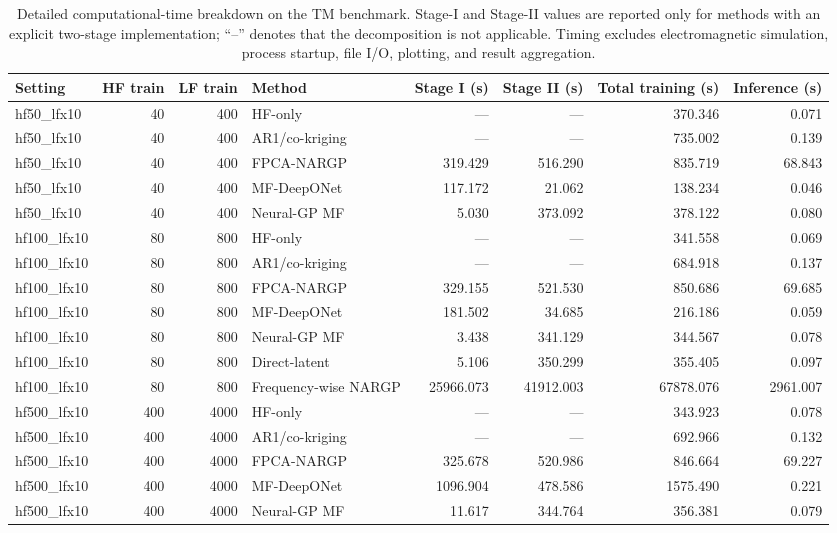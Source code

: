 
\begin{table}[t]
\centering
\caption{Detailed computational-time breakdown on the TM benchmark. Stage-I and Stage-II values are reported only for methods with an explicit two-stage implementation; ``--'' denotes that the decomposition is not applicable. Timing excludes electromagnetic simulation, process startup, file I/O, plotting, and result aggregation.}
\label{tab:timing_supp}
\begin{tabular}{lrrlrrrr}
\toprule
Setting & HF train & LF train & Method &
Stage I (s) & Stage II (s) &
Total training (s) & Inference (s) \\
\midrule
hf50_lfx10 & 40 & 400 & HF-only & — & — & 370.346 & 0.071 \\
hf50_lfx10 & 40 & 400 & AR1/co-kriging & — & — & 735.002 & 0.139 \\
hf50_lfx10 & 40 & 400 & FPCA-NARGP & 319.429 & 516.290 & 835.719 & 68.843 \\
hf50_lfx10 & 40 & 400 & MF-DeepONet & 117.172 & 21.062 & 138.234 & 0.046 \\
hf50_lfx10 & 40 & 400 & Neural-GP MF & 5.030 & 373.092 & 378.122 & 0.080 \\
hf100_lfx10 & 80 & 800 & HF-only & — & — & 341.558 & 0.069 \\
hf100_lfx10 & 80 & 800 & AR1/co-kriging & — & — & 684.918 & 0.137 \\
hf100_lfx10 & 80 & 800 & FPCA-NARGP & 329.155 & 521.530 & 850.686 & 69.685 \\
hf100_lfx10 & 80 & 800 & MF-DeepONet & 181.502 & 34.685 & 216.186 & 0.059 \\
hf100_lfx10 & 80 & 800 & Neural-GP MF & 3.438 & 341.129 & 344.567 & 0.078 \\
hf100_lfx10 & 80 & 800 & Direct-latent & 5.106 & 350.299 & 355.405 & 0.097 \\
hf100_lfx10 & 80 & 800 & Frequency-wise NARGP & 25966.073 & 41912.003 & 67878.076 & 2961.007 \\
hf500_lfx10 & 400 & 4000 & HF-only & — & — & 343.923 & 0.078 \\
hf500_lfx10 & 400 & 4000 & AR1/co-kriging & — & — & 692.966 & 0.132 \\
hf500_lfx10 & 400 & 4000 & FPCA-NARGP & 325.678 & 520.986 & 846.664 & 69.227 \\
hf500_lfx10 & 400 & 4000 & MF-DeepONet & 1096.904 & 478.586 & 1575.490 & 0.221 \\
hf500_lfx10 & 400 & 4000 & Neural-GP MF & 11.617 & 344.764 & 356.381 & 0.079 \\
\bottomrule
\end{tabular}
\end{table}
